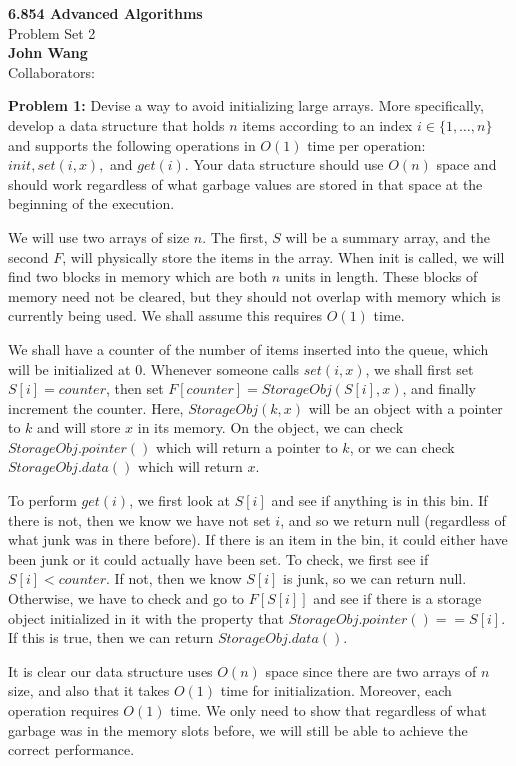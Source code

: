 \documentclass[psamsfonts]{amsart}
\newenvironment{sol}{\vspace{0.25cm}{\large \bfseries Solution:}}{\qedsymbol}
\newenvironment{prob}[1]{\begin{framed}{\large \bfseries Problem #1:}}{\end{framed}}
\newcommand{\makenewtitle}{
\begin{center}
{\huge \bfseries 6.854 Advanced Algorithms} \\
Problem Set 2\\
\vspace{0.25cm}
{\bfseries John Wang} \\
Collaborators:
\end{center}
\vspace{0.5cm}
}
\begin{document}
\makenewtitle
\begin{prob}{1}
Devise a way to avoid initializing large arrays. More specifically, develop a data structure that holds $n$ items according to an index $i \in \{1, \ldots, n\}$ and supports the following operations in $O(1)$ time per operation: $init, set(i,x),$ and $get(i)$. Your data structure should use $O(n)$ space and should work regardless of what garbage values are stored in that space at the beginning of the execution.
\end{prob}

\begin{sol}
We will use two arrays of size $n$. The first, $S$ will be a summary array, and the second $F$, will physically store the items in the array. When init is called, we will find two blocks in memory which are both $n$ units in length. These blocks of memory need not be cleared, but they should not overlap with memory which is currently being used. We shall assume this requires $O(1)$ time.

We shall have a counter of the number of items inserted into the queue, which will be initialized at 0. Whenever someone calls $set(i,x)$, we shall first set $S[i] = counter$, then set $F[counter] = StorageObj(S[i], x)$, and finally increment the counter. Here, $StorageObj(k, x)$ will be an object with a pointer to $k$ and will store $x$ in its memory. On the object, we can check $StorageObj.pointer()$ which will return a pointer to $k$, or we can check $StorageObj.data()$ which will return $x$. 

To perform $get(i)$, we first look at $S[i]$ and see if anything is in this bin. If there is not, then we know we have not set $i$, and so we return null (regardless of what junk was in there before). If there is an item in the bin, it could either have been junk or it could actually have been set. To check, we first see if $S[i] < counter$. If not, then we know $S[i]$ is junk, so we can return null. Otherwise, we have to check and go to $F[S[i]]$ and see if there is a storage object initialized in it with the property that $StorageObj.pointer() == S[i]$. If this is true, then we can return $StorageObj.data()$. 

It is clear our data structure uses $O(n)$ space since there are two arrays of $n$ size, and also that it takes $O(1)$ time for initialization. Moreover, each operation requires $O(1)$ time. We only need to show that regardless of what garbage was in the memory slots before, we will still be able to achieve the correct performance. 


\end{sol}
\end{document}
